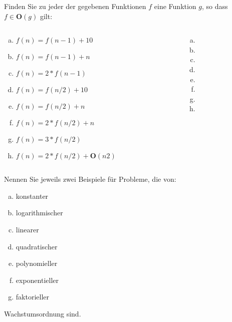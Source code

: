 \begin{card}
	Finden Sie zu jeder der gegebenen Funktionen $f$ eine Funktion $g$, so dass $f \in \mathbf{O}(g)$ gilt:
	\begin{columns}
		\begin{column}{.5\linewidth}
			\begin{enumerate}[a)]
			\item $f(n) =f(n - 1 ) + 10$
			\item $f(n) =f(n- 1 ) +n$
			\item $f(n) = 2*f(n- 1 )$
			\item $f(n) =f(n/ 2 ) + 10$
			\item $f(n) =f(n/ 2 ) +n$
			\item $f(n) = 2*f(n/ 2 ) +n$
			\item $f(n) = 3*f(n/ 2 )$
			\item $f(n) = 2*f(n/ 2 ) + \mathbf{O} (n2)$
			\end{enumerate}
		\end{column}
		\begin{column}{.5\linewidth}
			\begin{enumerate}[a)]
			\item 
			\item 
			\item 
			\item 
			\item 
			\item 
			\item 
			\item 
			\end{enumerate}
		\end{column}
	\end{columns}
\end{card}

\begin{card}
	Nennen Sie jeweils zwei Beispiele für Probleme, die von:
	\begin{enumerate}[a)]
	\item konstanter
	\item logarithmischer
	\item linearer
	\item quadratischer
	\item polynomieller
	\item exponentieller
	\item faktorieller 
	\end{enumerate}
	Wachstumsordnung sind.
	\hr
\end{card}

